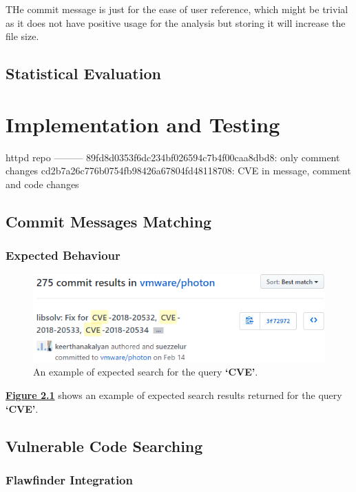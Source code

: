 \documentclass[12pt, a4paper]{report}
\begin{document}
THe commit message is just for the ease of user reference, which might be trivial as it does not
have positive usage for the analysis but storing it will increase the file size.

\section{Statistical Evaluation}

\chapter{Implementation and Testing}
httpd repo
---------
89fd8d0353f6dc234bf026594c7b4f00caa8dbd8: only comment changes
cd2b7a26c776b0754fb98426a67804fd48118708: CVE in message, comment and code changes

\section{Commit Messages Matching}
\subsection{Expected Behaviour}

\begin{figure}[H]
  \centering
  \includegraphics[width=.85\linewidth]{images/keyword_search.png}
  \caption{An example of expected search for the query \textbf{`CVE'}.}
  \label{figure:keyword_search}
\end{figure}

\hyperref[figure:keyword_search]{\textbf{Figure \ref*{figure:keyword_search}}} shows an example of
expected search results returned for the query \textbf{`CVE'}.

\section{Vulnerable Code Searching}

\subsection{Flawfinder Integration}
\end{document}
